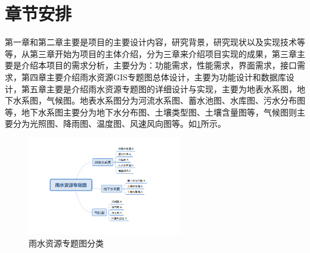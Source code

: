 \section{章节安排}
第一章和第二章主要是项目的主要设计内容，研究背景，研究现状以及实现技术等等，从第三章开始为项目的主体介绍，分为三章来介绍项目实现的成果，第三章主要是介绍本项目的需求分析，主要分为：功能需求，性能需求，界面需求，接口需求，第四章主要介绍雨水资源GIS专题图总体设计，主要为功能设计和数据库设计，第五章主要是介绍雨水资源专题图的详细设计与实现，主要为地表水系图，地下水系图，气候图。地表水系图分为河流水系图、蓄水池图、水库图、污水分布图等，地下水系图主要分为地下水分布图、土壤类型图、土壤含量图等，气候图则主要分为光照图、降雨图、温度图、风速风向图等。如\ref{fig:classify_rain}所示。
\begin{figure}[!htb]%
  \centering
  \includegraphics[width=0.60\textwidth]{figs/tree.png}
  \caption{雨水资源专题图分类}
  \label{fig:classify_rain}
\end{figure}

%

%

%
%





